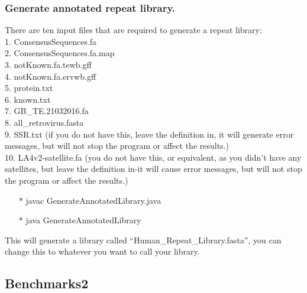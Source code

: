 \documentclass[12pt]{report}
\begin{document}
\subsubsection{Generate annotated repeat library.}
There are ten input files that are required to generate a repeat library: \\
1. ConsensusSequences.fa \\
2. ConsensusSequences.fa.map \\
3. notKnown.fa.tewb.gff \\
4. notKnown.fa.ervwb.gff \\
5. protein.txt \\
6. known.txt \\
7. GB\_TE.21032016.fa \\
8. all\_retrovirus.fasta \\
9. SSR.txt (if you do not have this, leave the definition in, it will generate error messages, but will not stop the program or affect the results.) \\
10. LA4v2-satellite.fa (you do not have this, or equivalent, as you didn't have any satellites, but leave the definition in-it will cause error messages, but will not stop the program or affect the results.)
\begin{enumerate}
	\item[*] javac GenerateAnnotatedLibrary.java
	\item[*] java GenerateAnnotatedLibrary
\end{enumerate}
This will generate a library called \textquotedblleft Human\_Repeat\_Library.fasta\textquotedblright, you can change this to whatever you want to call your library.

\subsection{Benchmarks2}
\end{document}
